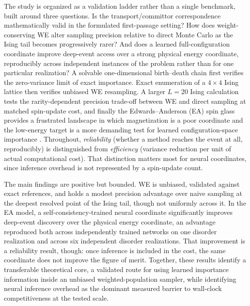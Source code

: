 \documentclass[a4paper,fleqn]{cas-sc}
\begin{document}
The study is organized as a validation ladder rather than a single benchmark, built around
three questions. Is the transport/committor correspondence mathematically valid in the
formulated first-passage setting? How does weight-conserving WE alter sampling precision
relative to direct Monte Carlo as the Ising tail becomes progressively rarer? And does a learned
full-configuration coordinate improve deep-event access over a strong physical energy
coordinate, reproducibly across independent instances of the problem rather than for one
particular realization? A solvable
one-dimensional birth--death chain first verifies the zero-variance limit of exact importance.
Exact enumeration of a $4\times4$ Ising lattice then verifies unbiased WE resampling. A larger
$L=20$ Ising calculation tests the rarity-dependent precision trade-off between WE and direct
sampling at matched spin-update cost, and finally the Edwards--Anderson (EA) spin glass provides a
frustrated landscape in which magnetization is a poor coordinate and the low-energy target is
a more demanding test for learned configuration-space importance
\citep{ising1925,onsager1944,edwards1975,binder1986}. Throughout, \emph{reliability} (whether
a method reaches the event at all, reproducibly) is distinguished from \emph{efficiency}
(variance reduction per unit of actual computational cost). That distinction matters most for
neural coordinates, since inference overhead is not represented by a spin-update count.

The main findings are positive but bounded. WE is unbiased, validated against exact
references, and holds a modest precision advantage over naive sampling at the deepest
resolved point of the Ising tail, though not uniformly across it. In the EA model, a
self-consistency-trained neural coordinate significantly improves deep-event discovery over
the physical energy coordinate, an advantage reproduced both across independently trained
networks on one disorder realization and across six independent disorder realizations. That
improvement is a reliability result, though: once inference is included in the cost, the same
coordinate does not improve the figure of merit. Together, these results identify a
transferable theoretical core, a validated route for using learned importance information
inside an unbiased weighted-population sampler, while identifying neural inference overhead as
the dominant measured barrier to wall-clock competitiveness at the tested scale.

\FloatBarrier

\end{document}
